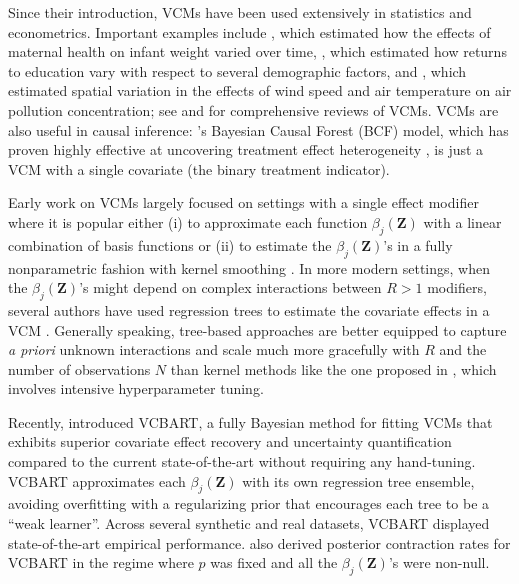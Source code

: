 \documentclass[11pt]{article}
\newcommand{\bZ}{\bm{Z}}
\theoremstyle{plain}
\theoremstyle{definition}
\theoremstyle{plain}
\begin{document}
Since their introduction, VCMs have been used extensively in statistics and econometrics.
Important examples include \citet{Hoover1998}, which estimated how the effects of maternal health on infant weight varied over time, \citet{Li2011}, which estimated how returns to education vary with respect to several demographic factors, and \citet{Mu2018}, which estimated spatial variation in the effects of wind speed and air temperature on air pollution concentration; see \citet{FanZhang2008} and \citet{Franco-Villoria2019} for comprehensive reviews of VCMs. 
VCMs are also useful in causal inference: \citet{Hahn2020}'s Bayesian Causal Forest (BCF) model, which has proven highly effective at uncovering treatment effect heterogeneity \citep{Dorie2019_automated}, is just a VCM with a single covariate (the binary treatment indicator).

Early work on VCMs largely focused on settings with a single effect modifier where it is popular either (i) to approximate each function $\beta_{j}(\bZ)$ with a linear combination of basis functions \citep[see, e.g.,][]{Huang2002, Wang2008, Wei2011, Bai2023} or (ii) to estimate the $\beta_{j}(\bZ)$'s in a fully nonparametric fashion with kernel smoothing \citep{Hoover1998, Wu2000, Li2002, Chiang2011}.
In more modern settings, when the $\beta_{j}(\bZ)$'s might depend on complex interactions between $R > 1$ modifiers, several authors have used regression trees to estimate the covariate effects in a VCM \citep[see, e.g.,][]{WangHastie2012,Burgin2015,ZhouHooker2022}. 
Generally speaking, tree-based approaches are better equipped to capture \textit{a priori} unknown interactions and scale much more gracefully with $R$ and the number of observations $N$ than kernel methods like the one proposed in \citet{LiRacine2010}, which involves intensive hyperparameter tuning.

Recently, \citet{Deshpande2024} introduced VCBART, a fully Bayesian method for fitting VCMs that exhibits superior covariate effect recovery and uncertainty quantification compared to the current state-of-the-art without requiring any hand-tuning.
VCBART approximates each $\beta_{j}(\bZ)$ with its own regression tree ensemble, avoiding overfitting with a regularizing prior that encourages each tree to be a ``weak learner''.
Across several synthetic and real datasets, VCBART displayed state-of-the-art empirical performance.
\citet{Deshpande2024} also derived posterior contraction rates for VCBART in the regime where $p$ was fixed and all the $\beta_{j}(\bZ)$'s were non-null.
\end{document}
